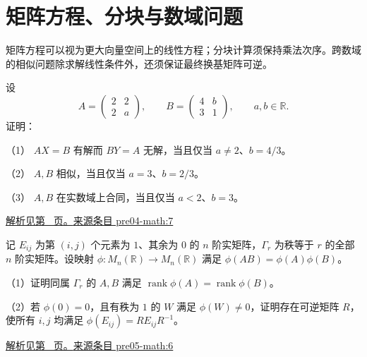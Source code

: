 \documentclass[UTF8,12pt,a4paper,fontset=fandol]{ctexart}
\begin{document}
\section{矩阵方程、分块与数域问题}

\label{sec:questions-9}

矩阵方程可以视为更大向量空间上的线性方程；分块计算须保持乘法次序。跨数域的相似问题除求解线性条件外，还须保证最终换基矩阵可逆。

\begin{example}\label{ex:pre04-math:7}

设
\[
A=\begin{pmatrix}2&2\\2&a\end{pmatrix},\qquad
B=\begin{pmatrix}4&b\\3&1\end{pmatrix},
\qquad a,b\in\mathbb R.
\]
证明：

（1） $AX=B$ 有解而 $BY=A$ 无解，当且仅当 $a\ne2$、$b=4/3$。

（2） $A,B$ 相似，当且仅当 $a=3$、$b=2/3$。

（3） $A,B$ 在实数域上合同，当且仅当 $a<2$、$b=3$。

\par\hyperref[ans:pre04-math:7]{解析见第~\pageref{ans:pre04-math:7} 页。}\quad\href{https://github.com/lzxcr/cmc-mathematics/blob/64916fa1fdbc3e444a652eca204d5669058ee321/src/problems/preliminary/04/07.md}{来源条目 pre04-math:7}

\end{example}

\begin{example}\label{ex:pre05-math:6}

记 $E_{ij}$ 为第 $(i,j)$ 个元素为 $1$、其余为 $0$ 的 $n$ 阶实矩阵，$\Gamma_r$ 为秩等于 $r$ 的全部 $n$ 阶实矩阵。设映射 $\phi:M_n(\mathbb R)\to M_n(\mathbb R)$ 满足 $\phi(AB)=\phi(A)\phi(B)$。

（1）证明同属 $\Gamma_r$ 的 $A,B$ 满足 $\operatorname{rank}\phi(A)=\operatorname{rank}\phi(B)$。

（2）若 $\phi(0)=0$，且有秩为 $1$ 的 $W$ 满足 $\phi(W)\ne0$，证明存在可逆矩阵 $R$，使所有 $i,j$ 均满足 $\phi(E_{ij})=RE_{ij}R^{-1}$。

\par\hyperref[ans:pre05-math:6]{解析见第~\pageref{ans:pre05-math:6} 页。}\quad\href{https://github.com/lzxcr/cmc-mathematics/blob/64916fa1fdbc3e444a652eca204d5669058ee321/src/problems/preliminary/05/06.md}{来源条目 pre05-math:6}

\end{example}
\end{document}
